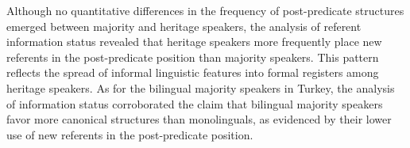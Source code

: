 Although no quantitative differences in the frequency of post-predicate structures emerged between majority and heritage speakers, the analysis of referent information status revealed that heritage speakers more frequently place new referents in the post-predicate position than majority speakers. This pattern reflects the spread of informal linguistic features into formal registers among heritage speakers. As for the bilingual majority speakers in Turkey, the analysis of information status corroborated the claim that bilingual majority speakers favor more canonical structures than monolinguals, as evidenced by their lower use of new referents in the post-predicate position.

